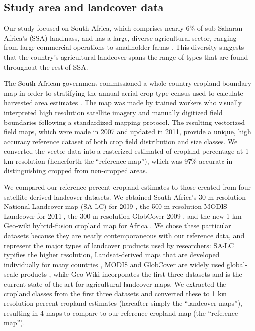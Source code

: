 \documentclass{pnastwo}
\begin{document}
\begin{article}
\vspace{-0.5 cm}
\section{Study area and landcover data}
Our study focused on South Africa, which comprises nearly 6\% of sub-Saharan Africa's (SSA) landmass, and has a large, diverse agricultural sector, ranging from large commercial operations to smallholder farms \cite{hardy_rainfed_2011,estes_using_2014}. This diversity suggests that the country's agricultural landcover spans the range of types that are found throughout the rest of SSA.  

The South African government commissioned a whole country cropland boundary map in order to stratifying the annual aerial crop type census used to calculate harvested area estimates \cite{fourie_better_2009}. The map was made by trained workers who visually interpreted high resolution satellite imagery and manually digitized field boundaries following a standardized mapping protocol. The resulting vectorized field maps, which were made in 2007 and updated in 2011, provide a unique, high accuracy reference dataset of both crop field distribution and size classes.  We converted the vector data into a rasterized estimated of cropland percentage at 1 km resolution (henceforth the ``reference map''), which was 97\% accurate in distinguishing cropped from non-cropped areas. 

We compared our reference percent cropland estimates to those created from four satellite-derived landcover datasets. We obtained South Africa's 30 m resolution National Landcover map (SA-LC) for 2009 \cite{sanbi_national_2009}, the 500 m resolution MODIS Landcover for 2011 \cite{land_processes_distributed_active_archive_center_lp_daac_modis_2011, friedl_modis_2010}, the 300 m resolution GlobCover 2009 \cite{arino_global_2012}, and the new 1 km Geo-wiki hybrid-fusion cropland map for Africa \cite{fritz_mapping_2015}. We chose these particular datasets because they are nearly contemporaneous with our reference data, and represent the major types of landcover products used by researchers: SA-LC typifies the higher resolution, Landsat-derived maps that are developed individually for many countries \cite{fry_completion_2009},  MODIS and GlobCover are widely used global-scale products \cite{gross_monitoring_2013,shackelford_conservation_2015}, while Geo-Wiki incorporates the first three datasets and is the current state of the art for agricultural landcover maps. We extracted the cropland classes from the first three datasets and converted these to 1 km resolution percent cropland estimates (hereafter simply the ``landcover maps''), resulting in 4 maps to compare to our reference cropland map (the ``reference map'').  


\end{article}
\end{document}
